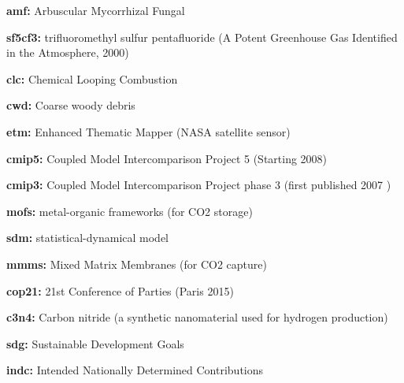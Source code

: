 \documentclass{article}
\begin{document}
\begin{linenumbers}
\noindent\textbf{amf:}  Arbuscular Mycorrhizal Fungal

\noindent\textbf{sf5cf3:} trifluoromethyl sulfur pentafluoride (A Potent Greenhouse Gas Identified in the Atmosphere, 2000)

\noindent\textbf{clc:} Chemical Looping Combustion

\noindent\textbf{cwd:} Coarse woody debris

\noindent\textbf{etm:} Enhanced Thematic Mapper (NASA satellite sensor)

\noindent\textbf{cmip5:} Coupled Model Intercomparison Project 5 (Starting 2008)

\noindent\textbf{cmip3:} Coupled Model Intercomparison Project phase 3 (first published 2007 \cite{Meehl2007})

\noindent\textbf{mofs:} metal-organic frameworks (for CO2 storage)

\noindent\textbf{sdm:} statistical-dynamical model

\noindent\textbf{mmms:} Mixed Matrix Membranes (for CO2 capture)

\noindent\textbf{cop21:} 21st Conference of Parties (Paris 2015) 

\noindent\textbf{c3n4:} Carbon nitride (a synthetic nanomaterial used for hydrogen production)

\noindent\textbf{sdg:} Sustainable Development Goals

\noindent\textbf{indc:} Intended Nationally Determined Contributions

		
	\end{linenumbers}

\linespread{1}

%
\end{document}
